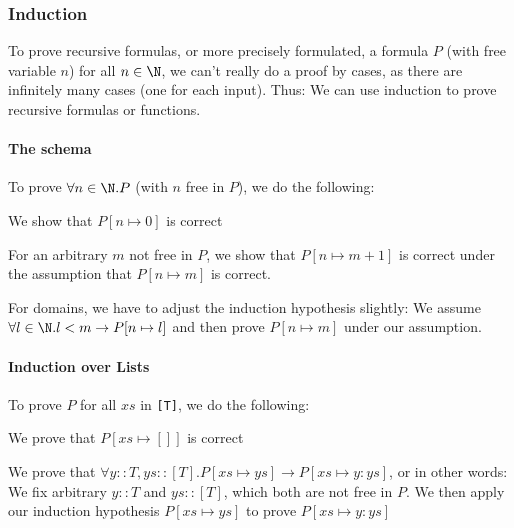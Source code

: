 \subsubsection{Induction}
To prove recursive formulas, or more precisely formulated, a formula $P$ (with free variable $n$) for all $n \in \N$,
we can't really do a proof by cases, as there are infinitely many cases (one for each input).
Thus: We can use induction to prove recursive formulas or functions.


\paragraph{The schema}
To prove $\forall n \in \N. P$ (with $n$ free in $P$), we do the following:

 We show that $P[n \mapsto 0]$ is correct

 For an arbitrary $m$ not free in $P$, we show that $P[n \mapsto m + 1]$ is correct under the assumption that $P[n \mapsto m]$ is correct.

For  domains, we have to adjust the induction hypothesis slightly: We assume $\forall l \in \N. l < m \rightarrow P[n \mapsto l]$
and then prove $P[n \mapsto m]$ under our assumption.


\paragraph{Induction over Lists}
To prove $P$ for all $xs$ in \texttt{[T]}, we do the following:

 We prove that $P[xs \mapsto []]$ is correct

 We prove that $\forall y :: T, ys :: [T]. P[xs \mapsto ys] \rightarrow P[xs \mapsto y : ys]$, or in other words:
We fix arbitrary $y :: T$ and $ys :: [T]$, which both are not free in $P$.
We then apply our induction hypothesis $P[xs \mapsto ys]$ to prove $P[xs \mapsto y : ys]$
